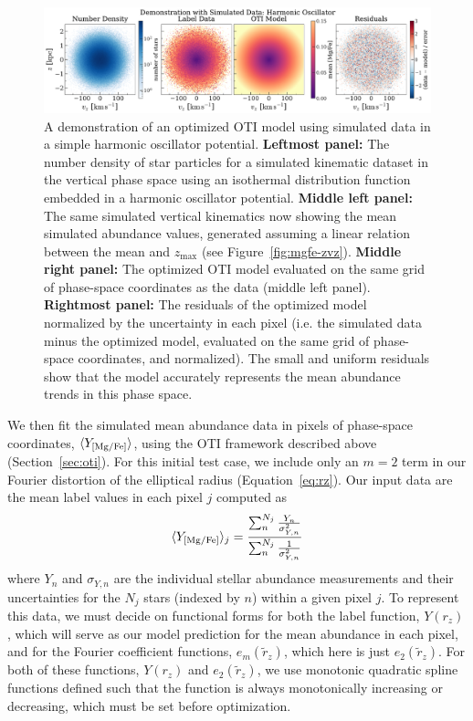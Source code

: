 \documentclass[modern]{aastex631}
\newcommand{\rz}{\ensuremath{r_z}}
\newcommand{\rzp}{\ensuremath{\tilde{r}_z}}
\begin{document}
\begin{figure}[t!]
\begin{center}
\includegraphics[width=\textwidth]{sho-data-model.pdf}
\end{center}
\caption{%
A demonstration of an optimized OTI model using simulated data in a simple harmonic
oscillator potential.
\textbf{Leftmost panel:} The number density of star particles for a simulated kinematic
dataset in the vertical phase space using an isothermal distribution function embedded in a harmonic oscillator potential.
\textbf{Middle left panel:} The same simulated vertical kinematics now showing the mean
simulated  abundance values, generated assuming a linear relation between
the mean  and $z_{\textrm{max}}$ (see Figure~\ref{fig:mgfe-zvz}).
\textbf{Middle right panel:} The optimized OTI model evaluated on the same grid of
phase-space coordinates as the data (middle left panel).
\textbf{Rightmost panel:} The residuals of the optimized model normalized by the
uncertainty in each pixel (i.e. the simulated data minus the optimized model, evaluated
on the same grid of phase-space coordinates, and normalized).
The small and uniform residuals show that the model accurately represents the mean
abundance trends in this phase space.
\label{fig:sho-data-model}
}
\end{figure}

We then fit the simulated mean abundance data in pixels of phase-space coordinates,
$\langle Y_{{[\mathrm{Mg}/\mathrm{Fe}]}} \rangle$, using the OTI framework described above
(Section~\ref{sec:oti}).
For this initial test case, we include only an $m=2$ term in our Fourier distortion of
the elliptical radius (Equation~\ref{eq:rz}).
Our input data are the mean label values in each pixel $j$ computed as
\begin{equation}
    \langle Y_{{[\mathrm{Mg}/\mathrm{Fe}]}} \rangle_j =
        \frac{\sum_n^{N_j} \frac{Y_n}{\sigma_{Y,n}^2}}{\sum_n^{N_j} \frac{1}{\sigma_{Y,n}^2}} \label{eq:mean-abun}
\end{equation}
where $Y_n$ and $\sigma_{Y, n}$ are the individual stellar abundance measurements and
their uncertainties for the $N_j$ stars (indexed by $n$) within a given pixel $j$.
To represent this data, we must decide on functional forms for both the label function,
$Y(\rz)$, which will serve as our model prediction for the mean abundance in each pixel,
and for the Fourier coefficient functions, $e_m(\rzp)$, which here is just $e_2(\rzp)$.
For both of these functions, $Y(\rz)$ and $e_2(\rzp)$, we use monotonic quadratic spline
functions defined such that the function is always monotonically increasing or
decreasing, which must be set before optimization.
\end{document}
